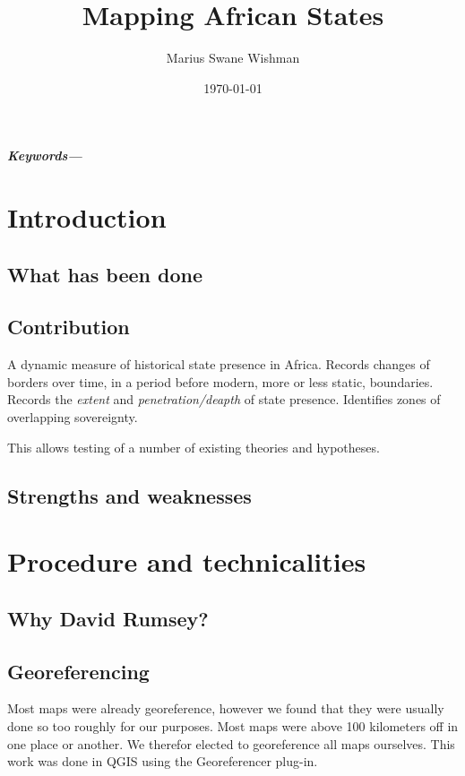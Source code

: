 \documentclass[12pt]{article}
\title{Mapping African States}
\author[1]{Marius Swane Wishman}
\affil[1]{Department of Sociology and Political Science, NTNU}
\date{\today}
\providecommand{\keywords}[1]
{
	\small	
	\textbf{\textit{Keywords---}} #1
}
\begin{document}
\maketitle

\begin{abstract}
\end{abstract}

\keywords{}

\pagebreak


\onehalfspacing

\section{Introduction}
\subsection{What has been done}
\subsection{Contribution}
A dynamic measure of historical state presence in Africa.
Records changes of borders over time, in a period before modern, more or less static, boundaries.
Records the \emph{extent} and \emph{penetration/deapth} of state presence.
Identifies zones of overlapping sovereignty.

This allows testing of a number of existing theories and hypotheses.
\subsection{Strengths and weaknesses}

\section{Procedure and technicalities}
\subsection{Why David Rumsey?}
\subsection{Georeferencing}
Most maps were already georeference, however we found that they were usually  done so too roughly for our purposes. 
Most maps were above 100 kilometers off in one place or another. 
We therefor elected to georeference all maps ourselves. 
This work was done in QGIS using the Georeferencer plug-in.
\end{document}
